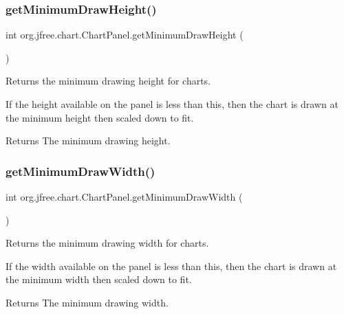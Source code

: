 \subsubsection{\texorpdfstring{get\+Minimum\+Draw\+Height()}{getMinimumDrawHeight()}}
{\footnotesize\ttfamily int org.\+jfree.\+chart.\+Chart\+Panel.\+get\+Minimum\+Draw\+Height (\begin{DoxyParamCaption}{ }\end{DoxyParamCaption})}

Returns the minimum drawing height for charts. 

If the height available on the panel is less than this, then the chart is drawn at the minimum height then scaled down to fit.

\begin{DoxyReturn}{Returns}
The minimum drawing height. 
\end{DoxyReturn}
\mbox{\label{classorg_1_1jfree_1_1chart_1_1_chart_panel_a59eb1e41f4bce283e166a781da9a2a01}} 
\subsubsection{\texorpdfstring{get\+Minimum\+Draw\+Width()}{getMinimumDrawWidth()}}
{\footnotesize\ttfamily int org.\+jfree.\+chart.\+Chart\+Panel.\+get\+Minimum\+Draw\+Width (\begin{DoxyParamCaption}{ }\end{DoxyParamCaption})}

Returns the minimum drawing width for charts. 

If the width available on the panel is less than this, then the chart is drawn at the minimum width then scaled down to fit.

\begin{DoxyReturn}{Returns}
The minimum drawing width. 
\end{DoxyReturn}
\mbox{\label{classorg_1_1jfree_1_1chart_1_1_chart_panel_a1486b59777a5870a8a0b7a1b42bab69c}} 
